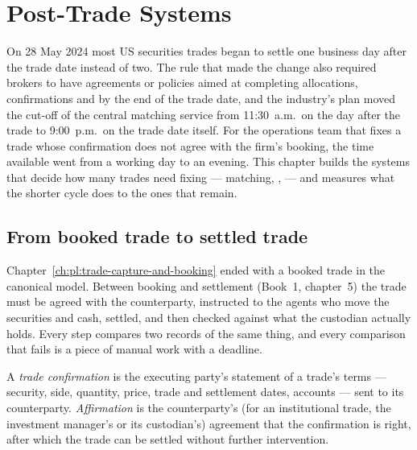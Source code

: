 \chapter{Post-Trade Systems}\label{ch:pl:post-trade-systems}

On 28 May 2024 most US securities trades began to settle one business day after the trade date instead of two. The rule that made the change
also required brokers to have agreements or policies aimed at completing allocations, confirmations and  by the end of the trade
date, and the industry's
plan moved the  cut-off of the central matching service from 11:30~a.m.\ on the day after the trade to 9:00~p.m.\ on the trade date
itself. For the operations team that fixes a trade whose confirmation does not agree with the firm's booking, the time available went from a
working day to an evening. This chapter builds the systems that decide how many trades need fixing --- matching, ,
 --- and measures what the shorter cycle does to the ones that remain.

\section{From booked trade to settled trade}

Chapter~\ref{ch:pl:trade-capture-and-booking} ended with a booked trade in the canonical model. Between booking and settlement (Book~1,
chapter~5) the trade must be agreed with the counterparty, instructed to the agents who move the securities and cash, settled, and then checked
against what the custodian actually holds. Every step compares two records of the same thing, and every comparison that fails is a piece of
manual work with a deadline.

\begin{definition}\label{def:pl:post-trade-systems:confirmation}
A \emph{trade confirmation} is the executing party's statement of a trade's terms --- security, side, quantity, price,
trade and settlement dates, accounts --- sent to its counterparty. \emph{Affirmation} is the counterparty's (for an
institutional trade, the investment manager's or its custodian's) agreement that the confirmation is right, after which the trade can be
settled without further intervention.
\end{definition}

